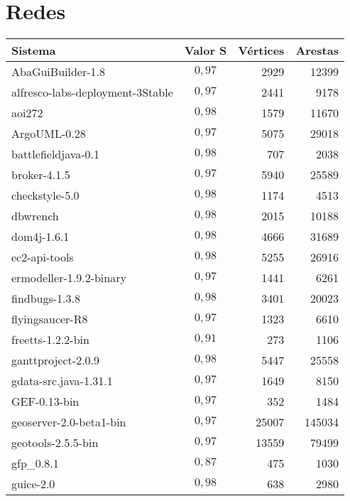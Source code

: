 \chapter{Redes}


%

\begin{center}
\begin{longtable}{| p{10cm} | c | r | r |}
	\hline
	\textbf{Sistema} & \textbf{Valor} S & \textbf{Vértices} & \textbf{Arestas} \\ \hline
	\hline
	AbaGuiBuilder-1.8 &  $0,97$ & 2929 & 12399 \\ \hline
	alfresco-labs-deployment-3Stable &  $0,97$ & 2441 & 9178 \\ \hline
	aoi272 &  $0,98$ & 1579 & 11670 \\ \hline
	ArgoUML-0.28 &  $0,97$ & 5075 & 29018 \\ \hline
	battlefieldjava-0.1 &  $0,98$ & 707 & 2038 \\ \hline
	broker-4.1.5 &  $0,97$ & 5940 & 25589 \\ \hline
	checkstyle-5.0 &  $0,98$ & 1174 & 4513 \\ \hline
	dbwrench &  $0,98$ & 2015 & 10188 \\ \hline
	dom4j-1.6.1 &  $0,98$ & 4666 & 31689 \\ \hline
	ec2-api-tools &  $0,98$ & 5255 & 26916 \\ \hline
	ermodeller-1.9.2-binary &  $0,97$ & 1441 & 6261 \\ \hline
	findbugs-1.3.8 &  $0,98$ & 3401 & 20023 \\ \hline
	flyingsaucer-R8 &  $0,97$ & 1323 & 6610 \\ \hline
	freetts-1.2.2-bin &  $0,91$ & 273 & 1106 \\ \hline
	ganttproject-2.0.9 &  $0,98$ & 5447 & 25558 \\ \hline
	gdata-src.java-1.31.1 &  $0,97$ & 1649 & 8150 \\ \hline
	GEF-0.13-bin &  $0,97$ & 352 & 1484 \\ \hline
	geoserver-2.0-beta1-bin &  $0,97$ & 25007 & 145034 \\ \hline
	geotools-2.5.5-bin &  $0,97$ & 13559 & 79499 \\ \hline
	gfp\_0.8.1 &  $0,87$ & 475 & 1030 \\ \hline
	guice-2.0 &  $0,98$ & 638 & 2980 \\ \hline

\end{longtable}
\end{center}
